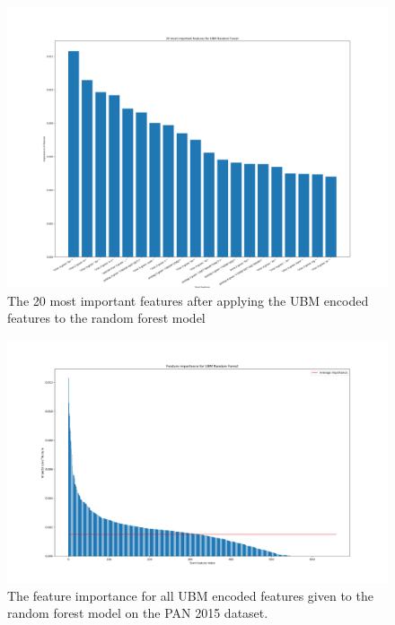 \begin{landscape}
    \begin{figure}
        \centering
        \includegraphics[scale=.34]{./pictures/FeatureImpotrance20.png}
        \caption{The 20 most important features after applying the UBM encoded
        features to the random forest model}
        \label{fig:feature_importance_small}
    \end{figure}
\end{landscape}

\begin{figure}
    \centering
    \includegraphics[scale=.34]{./pictures/FeatureImpotranceAll.png}
    \caption{The feature importance for all UBM encoded features given
    to the random forest model on the PAN 2015 dataset.}
    \label{fig:feature_importance_all}
\end{figure}

